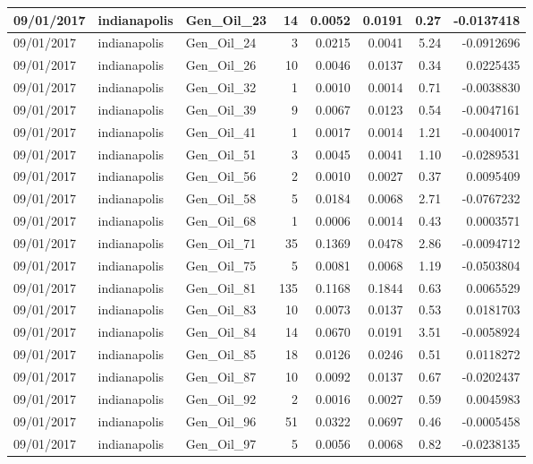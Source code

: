\documentclass[
  letterpaper,
  DIV=11,
  numbers=noendperiod]{scrartcl}
\begin{document}
\begin{tabular}{l|l|l|r|r|r|r|r}
\hline
09/01/2017 & indianapolis & Gen\_Oil\_23 & 14 & 0.0052 & 0.0191 & 0.27 & -0.0137418\\
\hline
09/01/2017 & indianapolis & Gen\_Oil\_24 & 3 & 0.0215 & 0.0041 & 5.24 & -0.0912696\\
\hline
09/01/2017 & indianapolis & Gen\_Oil\_26 & 10 & 0.0046 & 0.0137 & 0.34 & 0.0225435\\
\hline
09/01/2017 & indianapolis & Gen\_Oil\_32 & 1 & 0.0010 & 0.0014 & 0.71 & -0.0038830\\
\hline
09/01/2017 & indianapolis & Gen\_Oil\_39 & 9 & 0.0067 & 0.0123 & 0.54 & -0.0047161\\
\hline
09/01/2017 & indianapolis & Gen\_Oil\_41 & 1 & 0.0017 & 0.0014 & 1.21 & -0.0040017\\
\hline
09/01/2017 & indianapolis & Gen\_Oil\_51 & 3 & 0.0045 & 0.0041 & 1.10 & -0.0289531\\
\hline
09/01/2017 & indianapolis & Gen\_Oil\_56 & 2 & 0.0010 & 0.0027 & 0.37 & 0.0095409\\
\hline
09/01/2017 & indianapolis & Gen\_Oil\_58 & 5 & 0.0184 & 0.0068 & 2.71 & -0.0767232\\
\hline
09/01/2017 & indianapolis & Gen\_Oil\_68 & 1 & 0.0006 & 0.0014 & 0.43 & 0.0003571\\
\hline
09/01/2017 & indianapolis & Gen\_Oil\_71 & 35 & 0.1369 & 0.0478 & 2.86 & -0.0094712\\
\hline
09/01/2017 & indianapolis & Gen\_Oil\_75 & 5 & 0.0081 & 0.0068 & 1.19 & -0.0503804\\
\hline
09/01/2017 & indianapolis & Gen\_Oil\_81 & 135 & 0.1168 & 0.1844 & 0.63 & 0.0065529\\
\hline
09/01/2017 & indianapolis & Gen\_Oil\_83 & 10 & 0.0073 & 0.0137 & 0.53 & 0.0181703\\
\hline
09/01/2017 & indianapolis & Gen\_Oil\_84 & 14 & 0.0670 & 0.0191 & 3.51 & -0.0058924\\
\hline
09/01/2017 & indianapolis & Gen\_Oil\_85 & 18 & 0.0126 & 0.0246 & 0.51 & 0.0118272\\
\hline
09/01/2017 & indianapolis & Gen\_Oil\_87 & 10 & 0.0092 & 0.0137 & 0.67 & -0.0202437\\
\hline
09/01/2017 & indianapolis & Gen\_Oil\_92 & 2 & 0.0016 & 0.0027 & 0.59 & 0.0045983\\
\hline
09/01/2017 & indianapolis & Gen\_Oil\_96 & 51 & 0.0322 & 0.0697 & 0.46 & -0.0005458\\
\hline
09/01/2017 & indianapolis & Gen\_Oil\_97 & 5 & 0.0056 & 0.0068 & 0.82 & -0.0238135\\

\end{tabular}
\end{document}
